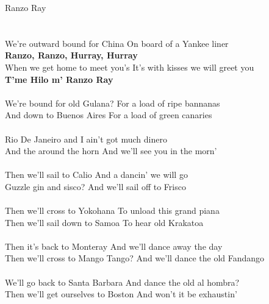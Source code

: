 \documentclass[letterpaper,9pt]{article}
\begin{document}
\newpage
{}
\huge
Ranzo Ray\\
\\
\LARGE
\noindent
\\We’re outward bound for China On board of a Yankee liner
\\\textbf{Ranzo, Ranzo, Hurray, Hurray}
\\When we get home to meet you’s It’s with kisses we will greet you
\\\textbf{T’me Hilo m’ Ranzo Ray}
\\
\\We’re bound for old Gulana? For a load of ripe bannanas
\\And down to Buenos Aires For a load of green canaries
\\
\\Rio De Janeiro and I ain’t got much dinero
\\And the around the horn And we’ll see you in the morn’
\\
\\Then we’ll sail to Calio And a dancin’ we will go
\\Guzzle gin and sisco? And we’ll sail off to Frisco
\\
\\Then we’ll cross to Yokohana To unload this grand piana
\\Then we’ll sail down to Samoa To hear old Krakatoa
\\
\\Then it’s back to Monteray And we’ll dance away the day
\\Then we’ll cross to Mango Tango? And we’ll dance the old Fandango
\\
\\We’ll go back to Santa Barbara And dance the old al hombra?
\\Then we’ll get ourselves to Boston And won’t it be exhaustin’
\end{document}
